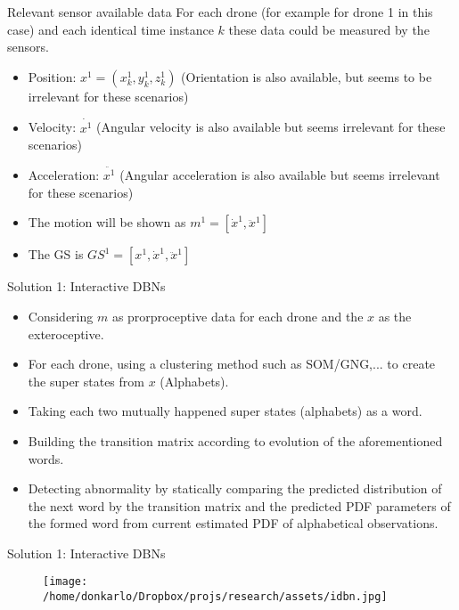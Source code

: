 \documentclass[unknownkeysallowed]{beamer}
\begin{document}
	\begin{frame}{Relevant sensor available data}
		For each drone (for example for drone 1 in this case) and each identical time instance $k$ these data could be measured by the sensors. 
		\begin{itemize}
			\item Position: $x^{1} = (x_{k}^{1},y_{k}^{1},z_{k}^{1})$ (Orientation is also available, but seems to be irrelevant for these scenarios)
			\item Velocity: $\dot{x^1}$ (Angular velocity is also available but seems irrelevant for these scenarios)
			\item Acceleration: $\ddot{x^1}$ (Angular acceleration is also available but seems irrelevant for these scenarios)
			\item The motion will be shown as $m^1=[\dot{x}^1,\ddot{x}^1]$
			\item The GS is $GS^1=[x^1,\dot{x}^1,\ddot{x}^1]$
		\end{itemize} 
		
	\end{frame}

	\begin{frame}{Solution 1: Interactive DBNs}
		\begin{itemize}
			\item Considering $m$ as prorproceptive data for each drone and the $x$ as the exteroceptive. 
			\item For each drone, using a clustering method such as SOM/GNG,... to create the super states from $x$ (Alphabets). 
			\item Taking each two mutually happened super states (alphabets) as a word. 
			\item Building the transition matrix according to evolution of the aforementioned words.
			\item Detecting abnormality by statically comparing the predicted distribution of the next word by the transition matrix and the predicted PDF parameters of the formed word from current estimated PDF of alphabetical observations. 
		\end{itemize}
	\end{frame}

	\begin{frame}{Solution 1: Interactive DBNs}
		\begin{figure}
			\texttt{[image: /home/donkarlo/Dropbox/projs/research/assets/idbn.jpg]}
		\end{figure}
	\end{frame}
\end{document}
